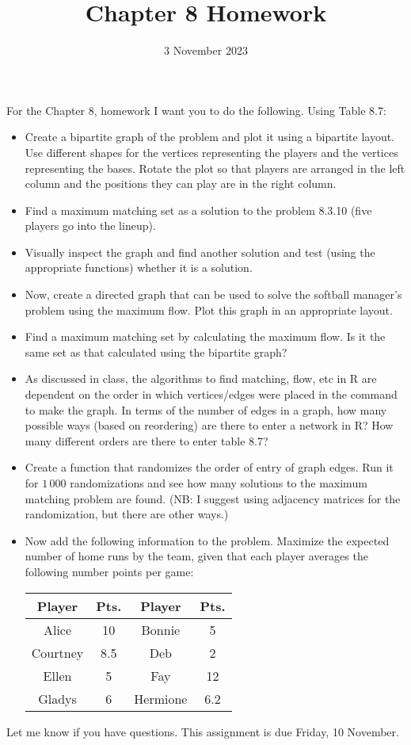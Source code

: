 \documentclass{article}
\title{Chapter 8 Homework}
\date{3 November 2023}
\begin{document}
\maketitle

For the Chapter 8, homework I want you to do the following. Using Table 8.7:

\begin{itemize}
\item Create a bipartite graph of the problem and plot it using a bipartite layout. Use different shapes for the vertices representing the players and the vertices representing the bases. Rotate the plot so that players are arranged in the left column and the positions they can play are in the right column.
\item Find a maximum matching set as a solution to the problem 8.3.10 (five players go into the lineup).
\item Visually inspect the graph and find another solution and test  (using the appropriate functions) whether it is a solution.
\item Now, create a directed graph that can be used to solve the softball manager's problem using the maximum flow. Plot this graph in an appropriate layout.
\item Find a maximum matching set by calculating the maximum flow. Is it the same set as that calculated using the bipartite graph?
\item As discussed in class, the algorithms to find matching, flow, etc in R are dependent on the order in which vertices/edges were placed in the command to make the graph. In terms of the number of edges in a graph, how many possible ways (based on reordering) are there to enter a network in R? How many different orders are there to enter table 8.7?
\item Create a function that randomizes the order of entry of graph edges. Run it for $1\,000$ randomizations and see how many solutions to the maximum matching problem are found. (NB: I suggest using adjacency matrices for the randomization, but there are other ways.)
\item Now add the following information to the problem. Maximize the expected number of home runs by the team, given that each player averages the following number points per game:
\begin{center}
\begin{tabular}{|c|c|c|c|}
\hline
Player & Pts. & Player & Pts. \\
\hline
Alice & 10 & Bonnie & 5 \\
Courtney & 8.5 & Deb &  2 \\
Ellen & 5 & Fay & 12 \\
Gladys & 6 & Hermione & 6.2 \\
\hline
\end{tabular}
\end{center}

\end{itemize}


Let me know if you have questions. This assignment is due Friday, 10 November.
\end{document}
